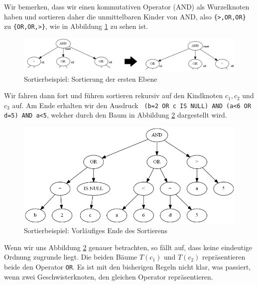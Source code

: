 Wir bemerken, dass wir einen kommutativen Operator (AND) als Wurzelknoten haben und sortieren daher die unmittelbaren Kinder von AND, also \verb|{>,OR,OR}| zu \verb|{OR,OR,>}|, wie in Abbildung \ref{fig:sort_ex1} zu sehen ist.

\begin{figure}
\includegraphics[scale=0.55]{Bilder/sort_ex12.png}
\caption{Sortierbeispiel: Sortierung der ersten Ebene}
\label{fig:sort_ex1}
\end{figure}

Wir fahren dann fort und führen sortieren rekursiv auf den Kindknoten $c_1,c_2$ und $c_3$ auf. Am Ende erhalten wir den Ausdruck \verb| (b=2 OR c IS NULL) AND (a<6 OR d=5) AND a<5|, welcher durch den Baum in Abbildung \ref{fig:sort_exfin1} dargestellt wird.

\begin{figure}
\includegraphics[scale=0.55]{Bilder/sort_exfin1.png}
\caption{Sortierbeispiel: Vorläufiges Ende des Sortierens}
\label{fig:sort_exfin1}
\end{figure}

Wenn wir uns Abbildung \ref{fig:sort_exfin1} genauer betrachten, so fällt auf, dass keine eindeutige Ordnung zugrunde liegt. Die beiden Bäume $T(c_1)$ und $T(c_2)$ repräsentieren beide den Operator \verb|OR|. Es ist mit den bisherigen Regeln nicht klar, was passiert, wenn zwei Geschwisterknoten, den gleichen Operator repräsentieren.


